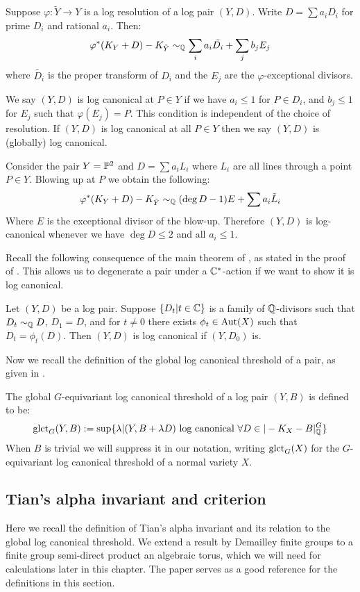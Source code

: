 Suppose \(\varphi: \tilde{Y} \to Y\) is a log resolution of a log pair \((Y,D)\). Write \(D = \sum a_i D_i\) for prime \(D_i\) and rational \(a_i\). Then:
\[
\varphi^*(K_Y+ D) - K_{\tilde{Y}}\sim_{\mathbb{Q}} \sum_i a_i \tilde{D_i} + \sum_j b_j E_j
\]
where \(\tilde{D_i}\) is the proper transform of \(D_i\) and the \(E_j\) are the \(\varphi\)-exceptional divisors. 
\begin{definition}
We say \((Y,D)\) is log canonical at \(P \in Y\) if we have \(a_i \le 1 \) for \(P \in D_i\), and \(b_j \le 1\) for \(E_j\) such that \(\varphi(E_j) = P\). This condition is independent of the choice of resolution. If \((Y,D)\) is log canonical at all \(P  \in Y\) then we say \((Y,D)\) is (globally) log canonical.
\end{definition}
\begin{example} \label{examplelct}
Consider the pair \(Y = \mathbb{P}^2\) and \(D = \sum a_i L_i\) where \(L_i\) are all lines through a point \(P \in Y\). Blowing up at \(P\) we obtain the following:
\[
\varphi^*(K_Y+D) - K_{\tilde{Y}} \sim_{\mathbb{Q}} (\deg D - 1) E + \sum a_i \tilde{L}_i
\]
Where \(E\) is the exceptional divisor  of the blow-up. Therefore \((Y,D)\) is log-canonical whenever we have \(\deg D \le 2\) and all \(a_i \le 1\).
\end{example}
Recall the following consequence of the main theorem of \cite{demailly2001}, as stated in the proof of \cite[Lemma 5.1]{cheltsov08}. This allows us to degenerate a pair under a \(\mathbb{C}^*\)-action if we want to show it is log canonical.
\begin{proposition} \label{degenpair}
Let \((Y,D)\) be a log pair. Suppose \(\{ D_t | t \in \mathbb{C}\}\) is a family of \(\mathbb{Q}\)-divisors such that \(D_t \sim_{\mathbb{Q}} D\), \(D_1 = D\), and for \(t \neq 0\) there exists \(\phi_t \in \mathop{\rm Aut}\nolimits(X)\) such that \(D_t = \phi_t(D)\). Then \((Y,D)\) is log canonical if \((Y,D_0)\) is.
\end{proposition}
Now we recall the definition of the global log canonical threshold of a pair, as given in \cite{suess18-2}.
\begin{definition}
The global \(G\)-equivariant log canonical threshold of a log pair \((Y,B)\)  is defined to be:
\[
\operatorname{glct}_{G}(Y,B) := \sup \{ \lambda | (Y,B+ \lambda D) \text{ log canonical } \forall D \in | -K_X - B |_{\mathbb{Q}}^G \}
\]
When \(B\) is trivial we will suppress it in our notation, writing \(\operatorname{glct}_G(X)\) for the \(G\)-equivariant log canonical threshold of a normal variety \(X\).
\end{definition}
\subsection{Tian's alpha invariant and criterion} \label{prelim:alphainvariant}
Here we recall the definition of Tian's alpha invariant and its relation to the global log canonical threshold. We extend a result by Demailley finite groups to a finite group semi-direct product an algebraic torus, which we will need for calculations later in this chapter. The paper \cite{cheltsov08} serves as a good reference for the definitions in this section.

